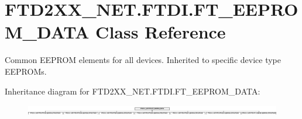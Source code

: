 \hypertarget{class_f_t_d2_x_x___n_e_t_1_1_f_t_d_i_1_1_f_t___e_e_p_r_o_m___d_a_t_a}{}\section{F\+T\+D2\+X\+X\+\_\+\+N\+E\+T.\+F\+T\+D\+I.\+F\+T\+\_\+\+E\+E\+P\+R\+O\+M\+\_\+\+D\+A\+TA Class Reference}
\label{class_f_t_d2_x_x___n_e_t_1_1_f_t_d_i_1_1_f_t___e_e_p_r_o_m___d_a_t_a}


Common E\+E\+P\+R\+OM elements for all devices. Inherited to specific device type E\+E\+P\+R\+O\+Ms.  


Inheritance diagram for F\+T\+D2\+X\+X\+\_\+\+N\+E\+T.\+F\+T\+D\+I.\+F\+T\+\_\+\+E\+E\+P\+R\+O\+M\+\_\+\+D\+A\+TA\+:\begin{figure}[H]
\begin{center}
\leavevmode
\includegraphics[height=0.461095cm]{class_f_t_d2_x_x___n_e_t_1_1_f_t_d_i_1_1_f_t___e_e_p_r_o_m___d_a_t_a}
\end{center}
\end{figure}
